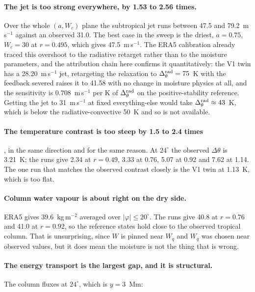 \documentclass[11pt]{article}
\newcommand{\Wq}{W_q}
\newcommand{\dyr}{\Delta_\theta^{\rm rad}}
\newcommand{\ms}{m\,s$^{-1}$}
\begin{document}
\paragraph{The jet is too strong everywhere, by 1.53 to 2.56 times.} Over the
whole $(a, W_c)$ plane the subtropical jet runs between 47.5 and 79.2~\ms{}
against an observed 31.0. The best case in the sweep is the driest,
$a = 0.75$, $W_c = 30$ at $r = 0.495$, which gives 47.5~\ms. The ERA5
calibration already traced this overshoot to the radiative retarget rather than
to the moisture parameters, and the attribution chain here confirms it
quantitatively: the V1 twin has a 28.20~\ms{} jet, retargeting the relaxation to
$\dyr = 75$~K with the feedback severed raises it to 41.58 with no change in
moisture physics at all, and the sensitivity is $0.708$~\ms{} per K of $\dyr$ on
the positive-stability reference. Getting the jet to 31~\ms{} at fixed
everything-else would take $\dyr \approx 43$~K, which is below the
radiative-convective 50~K and so is not available.

\paragraph{The temperature contrast is too steep by 1.5 to 2.4 times}, in the
same direction and for the same reason. At $24^\circ$ the observed
$\Delta\theta$ is 3.21~K; the runs give 2.34 at $r = 0.49$, 3.33 at 0.76, 5.07
at 0.92 and 7.62 at 1.14. The one run that matches the observed contrast closely
is the V1 twin at 1.13~K, which is too flat.

\paragraph{Column water vapour is about right on the dry side.} ERA5 gives
39.6~kg\,m$^{-2}$ averaged over $|\varphi| \le 20^\circ$. The runs give 40.8 at
$r = 0.76$ and 41.0 at $r = 0.92$, so the reference states hold close to the
observed tropical column. That is unsurprising, since $W$ is pinned near $\Wq$
and $\Wq$ was chosen near observed values, but it does mean the moisture is not
the thing that is wrong.

\paragraph{The energy transport is the largest gap, and it is structural.}
The column fluxes at $24^\circ$, which is $y = 3$~Mm:

\begin{center}

\end{center}
\end{document}
